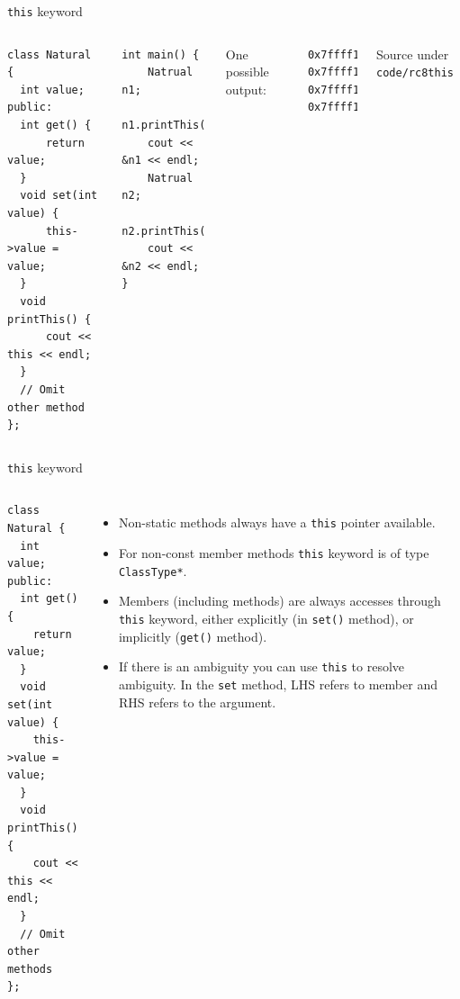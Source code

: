 \begin{frame}[fragile]{\texttt{this} keyword}
\begin{columns}[]
	
	\vspace{-.3in}
\begin{verbatim}
class Natural {
  int value;
public:
  int get() { 
      return value;
  }
  void set(int value) {
      this->value = value;
  }
  void printThis() {
      cout << this << endl;
  }
  // Omit other method
};
\end{verbatim}
	
	
	\vspace{-.3in}
\begin{verbatim}
int main() {
    Natrual n1; 
    n1.printThis(); 
    cout << &n1 << endl;
    Natrual n2; 
    n2.printThis();
    cout << &n2 << endl;
}
\end{verbatim}

One \alert{possible} output:

\begin{verbatim}
0x7ffff1fd2820
0x7ffff1fd2820
0x7ffff1fd2830
0x7ffff1fd2830
\end{verbatim}

Source under \texttt{code/rc8this}

\end{columns}
\end{frame}

\begin{frame}[fragile]{\texttt{this} keyword}
\begin{columns}[]
	
	\vspace{-.3in}
\begin{verbatim}
class Natural {
  int value;
public:
  int get() { 
    return value;
  }
  void set(int value) {
    this->value = value;
  }
  void printThis() {
    cout << this << endl;
  }
  // Omit other methods
};
\end{verbatim}
	
	\vspace{-.2in}
	\begin{itemize}
		\item Non-static methods always have a \texttt{this} pointer available.
		\item For non-const member methods \texttt{this} keyword is of type \texttt{ClassType*}.
		\item Members (including methods) are \alert{always} accesses through \texttt{this} keyword, either explicitly (in \texttt{set()} method), or implicitly (\texttt{get()} method).
		\item If there is an ambiguity you can use \texttt{this} to resolve ambiguity. In the \texttt{set} method, LHS refers to member and RHS refers to the argument.
	\end{itemize}
\end{columns}
\end{frame}

